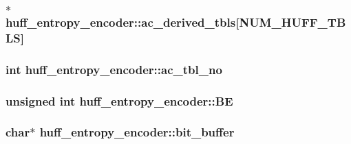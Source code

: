 \subsubsection[{ac\+\_\+derived\+\_\+tbls}]{$\ast$ huff\+\_\+entropy\+\_\+encoder\+::ac\+\_\+derived\+\_\+tbls\mbox{[}{\bf N\+U\+M\+\_\+\+H\+U\+F\+F\+\_\+\+T\+B\+L\+S}\mbox{]}}\label{structhuff__entropy__encoder_a0b67beb3a73da24b5d09693f3c0c8b22}
\hypertarget{structhuff__entropy__encoder_a43f8a73e36740cd79fde6e45efef6d16}{}
\subsubsection[{ac\+\_\+tbl\+\_\+no}]{\setlength{\rightskip}{0pt plus 5cm}int huff\+\_\+entropy\+\_\+encoder\+::ac\+\_\+tbl\+\_\+no}\label{structhuff__entropy__encoder_a43f8a73e36740cd79fde6e45efef6d16}
\hypertarget{structhuff__entropy__encoder_a60927ee1fdfb068cb003c17587770a2b}{}
\subsubsection[{B\+E}]{\setlength{\rightskip}{0pt plus 5cm}unsigned int huff\+\_\+entropy\+\_\+encoder\+::\+B\+E}\label{structhuff__entropy__encoder_a60927ee1fdfb068cb003c17587770a2b}
\hypertarget{structhuff__entropy__encoder_adc619a5c8cb0398b78fb015c618ffdea}{}
\subsubsection[{bit\+\_\+buffer}]{\setlength{\rightskip}{0pt plus 5cm}char$\ast$ huff\+\_\+entropy\+\_\+encoder\+::bit\+\_\+buffer}\label{structhuff__entropy__encoder_adc619a5c8cb0398b78fb015c618ffdea}
\hypertarget{structhuff__entropy__encoder_a46ddb16b709ccae209e295480f2d38b6}{}
